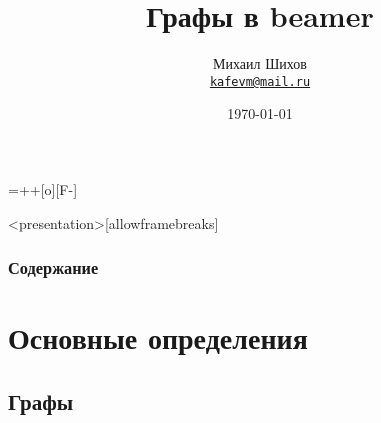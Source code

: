 \usepackage{etex}


\usepackage[russian]{babel}
\usepackage[utf8]{inputenc}
\usepackage{graphicx}
\usepackage[all]{xy}
\entrymodifiers={++[o][F-]}

\title[Графы в beamer]{Графы в beamer}
\date{\today}
\author[М.~М.~Шихов]{Михаил Шихов \\ \texttt{\underline{kafevm@mail.ru}}}






\begin{frame}<presentation>[allowframebreaks]
    \frametitle{Содержание}
    \tableofcontents
\end{frame}


\section{Основные определения}

\subsection{Графы}

